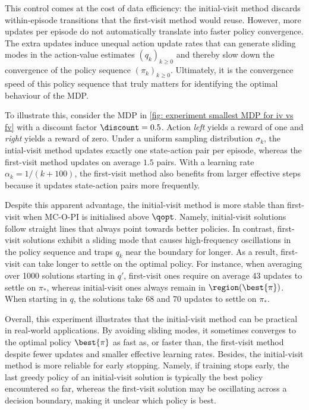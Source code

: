 This control comes at the cost of data efficiency: the initial-visit method discards within-episode transitions that the first-visit method would reuse. However, more updates per episode do not automatically translate into faster policy convergence.
The extra updates induce unequal action update rates that can generate sliding modes in the action-value estimates $(q_k)_{k \ge 0}$ and thereby slow down the convergence of the policy sequence $(\pi_k)_{k \ge 0}$. Ultimately, it is the convergence speed of this policy sequence that truly matters for identifying the optimal behaviour of the MDP.

To illustrate this, consider the MDP in \autoref{fig: experiment smallest MDP for iv vs fv} with a discount factor $\discount = 0.5$. Action \textit{left} yields a reward of one and \textit{right} yields a reward of zero.
Under a uniform sampling distribution $\sigma_k$, the intial-visit method updates exactly one state-action pair per episode, whereas the first-visit method updates on average $1.5$ pairs.
With a learning rate $\alpha_k = 1/(k+100)$, the first-visit method also benefits from larger effective steps because it updates state-action pairs more frequently.


Despite this apparent advantage, the initial-visit method is more stable than first-visit when MC-O-PI is initialised above $\qopt$.
Namely, initial-visit solutions follow straight lines that always point towards better policies.
In contrast, first-visit solutions exhibit a sliding mode that causes high-frequency oscillations in the policy sequence and traps $q_k$ near the boundary for longer.
As a result, first-visit can take longer to settle on the optimal policy.
For instance, when averaging over 1000 solutions starting in $q'$, first-visit ones require on average 43 updates to settle on $\pi_*$, whereas initial-visit ones always remain in $\region(\best{\pi})$.
When starting in $q$, the solutions take 68 and 70 updates to settle on $\pi_*$.


Overall, this experiment illustrates that the initial-visit method can be practical in real-world applications. 
By avoiding sliding modes, it sometimes converges to the optimal policy $\best{\pi}$ as fast as, or faster than, the first-visit method despite fewer updates and smaller effective learning rates.
Besides, the initial-visit method is more reliable for early stopping. Namely, if training stops early, the last greedy policy of an initial-visit solution is typically the best policy encountered so far, whereas the first-visit solution may be oscillating across a decision boundary, making it unclear which policy is best.

